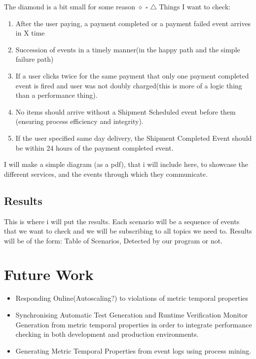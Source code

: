 \documentclass{article}
\begin{document}
The diamond is a bit small for some reason
$\diamond$
$\square$
$\triangle$
Things I want to check:
\begin{enumerate}
	\item After the user paying, a payment completed or a payment failed event arrives in X time
	\item Succession of events in a timely manner(in the happy path and the simple failure path)
	\item If a user clicks twice for the same payment that only one payment completed event is fired and user was not doubly charged(this is more of a logic thing than a performance thing).
	\item No items should arrive without a Shipment Scheduled event before them (ensuring process efficiency and integrity).
	\item If the user specified same day delivery, the Shipment Completed Event should be within 24 hours of the payment completed event.
\end{enumerate}

I will make a simple diagram (as a pdf), that i will include here, to showcase the different services, and the events through which they communicate.

\subsection{Results}
This is where i will put the results. Each scenario will be a sequence of events that we want to check and we will be subscribing to all topics we need to.
Results will be of the form: Table of Scenarios, Detected by our program or not.

\section{Future Work}
\begin{itemize}
	\item Responding Online(Autoscaling?) to violations of metric temporal properties
	\item Synchronising Automatic Test Generation and Runtime Verification Monitor Generation from metric temporal properties in order to integrate performance checking in both development and production environments.
	\item Generating Metric Temporal Properties from event logs using process mining.
\end{itemize}
\end{document}
